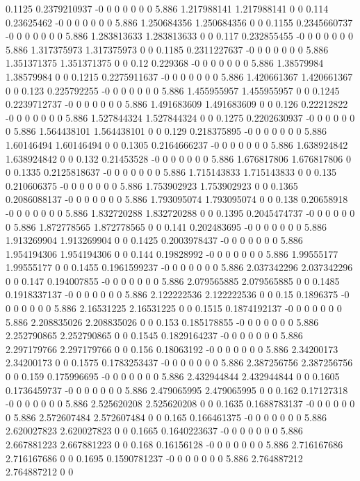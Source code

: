 {0.1125 0.2379210937 -0 0 0 0 0 0 0 5.886 1.217988141 1.217988141 0 0
0.114 0.23625462 -0 0 0 0 0 0 0 5.886 1.250684356 1.250684356 0 0
0.1155 0.2345660737 -0 0 0 0 0 0 0 5.886 1.283813633 1.283813633 0 0
0.117 0.232855455 -0 0 0 0 0 0 0 5.886 1.317375973 1.317375973 0 0
0.1185 0.2311227637 -0 0 0 0 0 0 0 5.886 1.351371375 1.351371375 0 0
0.12 0.229368 -0 0 0 0 0 0 0 5.886 1.38579984 1.38579984 0 0
0.1215 0.2275911637 -0 0 0 0 0 0 0 5.886 1.420661367 1.420661367 0 0
0.123 0.225792255 -0 0 0 0 0 0 0 5.886 1.455955957 1.455955957 0 0
0.1245 0.2239712737 -0 0 0 0 0 0 0 5.886 1.491683609 1.491683609 0 0
0.126 0.22212822 -0 0 0 0 0 0 0 5.886 1.527844324 1.527844324 0 0
0.1275 0.2202630937 -0 0 0 0 0 0 0 5.886 1.564438101 1.564438101 0 0
0.129 0.218375895 -0 0 0 0 0 0 0 5.886 1.60146494 1.60146494 0 0
0.1305 0.2164666237 -0 0 0 0 0 0 0 5.886 1.638924842 1.638924842 0 0
0.132 0.21453528 -0 0 0 0 0 0 0 5.886 1.676817806 1.676817806 0 0
0.1335 0.2125818637 -0 0 0 0 0 0 0 5.886 1.715143833 1.715143833 0 0
0.135 0.210606375 -0 0 0 0 0 0 0 5.886 1.753902923 1.753902923 0 0
0.1365 0.2086088137 -0 0 0 0 0 0 0 5.886 1.793095074 1.793095074 0 0
0.138 0.20658918 -0 0 0 0 0 0 0 5.886 1.832720288 1.832720288 0 0
0.1395 0.2045474737 -0 0 0 0 0 0 0 5.886 1.872778565 1.872778565 0 0
0.141 0.202483695 -0 0 0 0 0 0 0 5.886 1.913269904 1.913269904 0 0
0.1425 0.2003978437 -0 0 0 0 0 0 0 5.886 1.954194306 1.954194306 0 0
0.144 0.19828992 -0 0 0 0 0 0 0 5.886 1.99555177 1.99555177 0 0
0.1455 0.1961599237 -0 0 0 0 0 0 0 5.886 2.037342296 2.037342296 0 0
0.147 0.194007855 -0 0 0 0 0 0 0 5.886 2.079565885 2.079565885 0 0
0.1485 0.1918337137 -0 0 0 0 0 0 0 5.886 2.122222536 2.122222536 0 0
0.15 0.1896375 -0 0 0 0 0 0 0 5.886 2.16531225 2.16531225 0 0
0.1515 0.1874192137 -0 0 0 0 0 0 0 5.886 2.208835026 2.208835026 0 0
0.153 0.185178855 -0 0 0 0 0 0 0 5.886 2.252790865 2.252790865 0 0
0.1545 0.1829164237 -0 0 0 0 0 0 0 5.886 2.297179766 2.297179766 0 0
0.156 0.18063192 -0 0 0 0 0 0 0 5.886 2.34200173 2.34200173 0 0
0.1575 0.1783253437 -0 0 0 0 0 0 0 5.886 2.387256756 2.387256756 0 0
0.159 0.175996695 -0 0 0 0 0 0 0 5.886 2.432944844 2.432944844 0 0
0.1605 0.1736459737 -0 0 0 0 0 0 0 5.886 2.479065995 2.479065995 0 0
0.162 0.17127318 -0 0 0 0 0 0 0 5.886 2.525620208 2.525620208 0 0
0.1635 0.1688783137 -0 0 0 0 0 0 0 5.886 2.572607484 2.572607484 0 0
0.165 0.166461375 -0 0 0 0 0 0 0 5.886 2.620027823 2.620027823 0 0
0.1665 0.1640223637 -0 0 0 0 0 0 0 5.886 2.667881223 2.667881223 0 0
0.168 0.16156128 -0 0 0 0 0 0 0 5.886 2.716167686 2.716167686 0 0
0.1695 0.1590781237 -0 0 0 0 0 0 0 5.886 2.764887212 2.764887212 0 0
}
